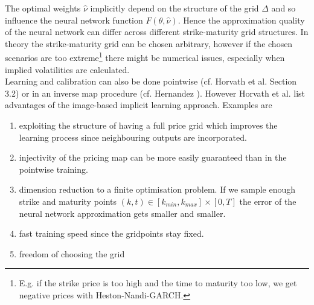 \documentclass{article}
\begin{document}
The optimal weights $\hat{\nu}$ implicitly depend on the structure of the grid $\Delta$ and so influence the neural network function $F(\theta, \hat{\nu})$. Hence the approximation quality of the neural network can differ across different strike-maturity grid structures. In theory the strike-maturity grid can be chosen arbitrary, however if the chosen scenarios are too extreme\footnote{E.g. if the strike price is too high and the time to maturity too low, we get negative prices with Heston-Nandi-GARCH.} there might be numerical issues, especially when implied volatilities are calculated. \\
Learning and calibration can also be done pointwise (cf. Horvath et al. \cite{Blanka} Section 3.2) or in an inverse map procedure (cf. Hernandez \cite{Hernandez}). However Horvath et al. \cite{Blanka} list advantages of the image-based implicit learning approach. Examples are
\begin{enumerate}
    \item exploiting the structure of having a full price grid which improves the learning process since neighbouring outputs are incorporated.
    \item injectivity of the pricing map can be more easily guaranteed than in the pointwise training.
    \item dimension reduction to a finite optimisation problem. If we sample enough strike and maturity points $(k,t) \in [k_{min},k_{max}] \times [0,T]$ the error of the neural network approximation gets smaller and smaller. 
    \item fast training speed since the gridpoints stay fixed.
    \item freedom of choosing the grid 
\end{enumerate}
\end{document}
